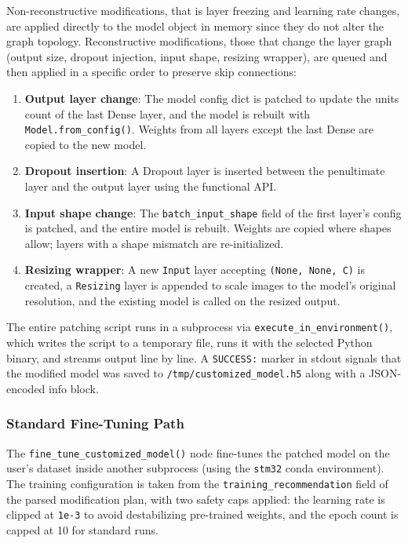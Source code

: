 Non-reconstructive modifications, that is layer freezing and learning rate changes, are applied directly to the model object in memory since they do not alter the graph topology. Reconstructive modifications, those that change the layer graph (output size, dropout injection, input shape, resizing wrapper), are queued and then applied in a specific order to preserve skip connections:

\begin{enumerate}[noitemsep, topsep=4pt]
  \item \textbf{Output layer change}: The model config dict is patched to update the units count of the last Dense layer, and the model is rebuilt with \texttt{Model.from\_config()}. Weights from all layers except the last Dense are copied to the new model.
  \item \textbf{Dropout insertion}: A Dropout layer is inserted between the penultimate layer and the output layer using the functional API.
  \item \textbf{Input shape change}: The \texttt{batch\_\allowbreak input\_\allowbreak shape} field of the first layer's config is patched, and the entire model is rebuilt. Weights are copied where shapes allow; layers with a shape mismatch are re-initialized.
  \item \textbf{Resizing wrapper}: A new \texttt{Input} layer accepting \texttt{(None, None, C)} is created, a \texttt{Resizing} layer is appended to scale images to the model's original resolution, and the existing model is called on the resized output.
\end{enumerate}

The entire patching script runs in a subprocess via \texttt{execute\_\allowbreak in\_\allowbreak environment()}, which writes the script to a temporary file, runs it with the selected Python binary, and streams output line by line. A \texttt{SUCCESS:} marker in stdout signals that the modified model was saved to \texttt{/tmp/customized\_model.h5} along with a JSON-encoded info block.

\subsubsection{Standard Fine-Tuning Path}
\label{sec:standard_fine_tuning}

The \texttt{fine\_\allowbreak tune\_\allowbreak customized\_\allowbreak model()} node fine-tunes the patched model on the user's dataset inside another subprocess (using the \texttt{stm32} conda environment). The training configuration is taken from the \texttt{training\_recommendation} field of the parsed modification plan, with two safety caps applied: the learning rate is clipped at \texttt{1e-3} to avoid destabilizing pre-trained weights, and the epoch count is capped at 10 for standard runs.

